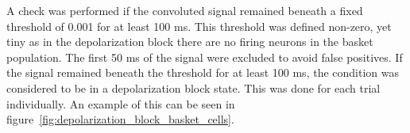 \noindent A check was performed if the convoluted signal remained beneath a fixed
threshold of 0.001 for at least 100 ms. This threshold was defined non-zero,
yet tiny as in the depolarization block there are no firing neurons in the
basket population. The first 50 ms of the signal were excluded to avoid false
positives. If the signal remained beneath the threshold for at least 100 ms,
the condition was considered to be in a depolarization block state. This was
done for each trial individually. An example of this can be seen in figure~\ref{fig:depolarization_block_basket_cells}.

